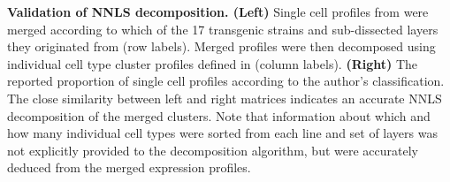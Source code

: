 \textbf{Validation of NNLS decomposition. (Left)} Single cell profiles from \cite{Tasic_2016} were merged according to which of the 17 transgenic strains and sub-dissected layers they originated from (row labels). Merged profiles were then decomposed using individual cell type cluster profiles defined in \cite{Tasic_2016} (column labels). \textbf{(Right)} The reported proportion of single cell profiles according to the author's classification. The close similarity between left and right matrices indicates an accurate NNLS decomposition of the merged clusters. Note that information about which and how many individual cell types were sorted from each line and set of layers was not explicitly provided to the decomposition algorithm, but were accurately deduced from the merged expression profiles.
